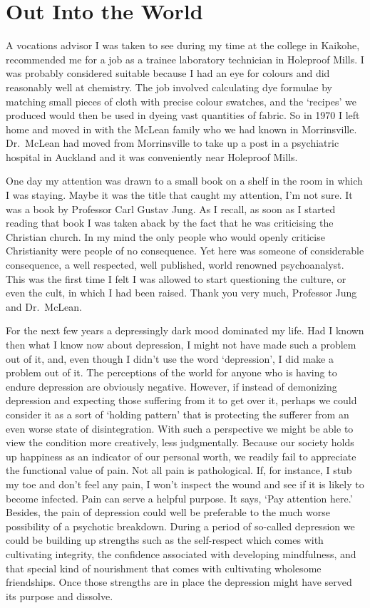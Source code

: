 \chapter{Out Into the World}

A vocations advisor I was taken to see during my time at the college in
Kaikohe, recommended me for a job as a trainee laboratory technician in
Holeproof Mills. I was probably considered suitable because I had
an eye for colours and did reasonably well at chemistry. The job
involved calculating dye formulae by matching small pieces of cloth with
precise colour swatches, and the `recipes' we produced would then be
used in dyeing vast quantities of fabric. So in 1970 I left home and
moved in with the McLean family who we had known in Morrinsville.
Dr.~McLean had moved from Morrinsville to take up a post in a psychiatric
hospital in Auckland and it was conveniently near Holeproof Mills.

One day my attention was drawn to a small book on a shelf in the room in
which I was staying. Maybe it was the title that caught my attention,
I'm not sure. It was a book by Professor Carl Gustav Jung. As I recall,
as soon as I started reading that book I was taken aback by the fact
that he was criticising the Christian church. In my mind the only people
who would openly criticise Christianity were people of no consequence.
Yet here was someone of considerable consequence, a well respected, well
published, world renowned psychoanalyst. This was the first time I felt
I was allowed to start questioning the culture, or even the cult, in
which I had been raised. Thank you very much, Professor Jung and Dr.~McLean.

For the next few years a depressingly dark mood dominated my life. Had I
known then what I know now about depression, I might not have made such
a problem out of it, and, even though I didn't use the word
`depression', I did make a problem out of it. The perceptions of the
world for anyone who is having to endure depression are obviously
negative. However, if instead of demonizing depression and expecting
those suffering from it to get over it, perhaps we could consider it as
a sort of `holding pattern' that is protecting the sufferer from an even
worse state of disintegration. With such a perspective we might be able
to view the condition more creatively, less judgmentally. Because our
society holds up happiness as an indicator of our personal worth, we
readily fail to appreciate the functional value of pain. Not all pain is
pathological. If, for instance, I stub my toe and don't feel any pain, I
won't inspect the wound and see if it is likely to become infected. Pain
can serve a helpful purpose. It says, `Pay attention here.' Besides, the
pain of depression could well be preferable to the much worse
possibility of a psychotic breakdown. During a period of so-called
depression we could be building up strengths such as the self-respect
which comes with cultivating integrity, the confidence associated with
developing mindfulness, and that special kind of nourishment that comes
with cultivating wholesome friendships. Once those strengths are in
place the depression might have served its purpose and dissolve.


